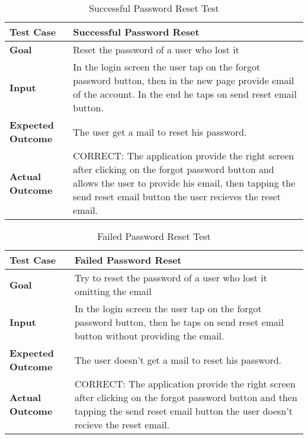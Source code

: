 \begin{table}[H]
	\centering
	\begin{tabular}{|l|l|}
	\hline
	\textbf{Test Case}& Successful Password Reset\\
	\hline
	\textbf{Goal}& Reset the password of a user who lost it\\
	\hline
	\textbf{Input}& 
	\begin{minipage}{.7\linewidth}
	In the login screen the user tap on the forgot password button, then in the new page provide email of the account. In the end he taps on send reset email button.
	\end{minipage}\\
	\hline
	\textbf{Expected Outcome}& The user get a mail to reset his password.\\
	\hline
	\textbf{Actual Outcome}& 
	\begin{minipage}{.7\linewidth}
	CORRECT: The application provide the right screen after clicking on the forgot password button and allows the user to provide his email, then tapping the send reset email button the user recieves the reset email.
	\end{minipage}\\
	\hline	
	\end{tabular}
	\caption{Successful Password Reset Test}
\end{table}

\begin{table}[H]
	\centering
	\begin{tabular}{|l|l|}
	\hline
	\textbf{Test Case}& Failed Password Reset\\
	\hline
	\textbf{Goal}& Try to reset the password of a user who lost it omitting the email\\
	\hline
	\textbf{Input}& 
	\begin{minipage}{.7\linewidth}
	In the login screen the user tap on the forgot password button, then he taps on send reset email button without providing the email.
	\end{minipage}\\
	\hline
	\textbf{Expected Outcome}& The user doesn't get a mail to reset his password.\\
	\hline
	\textbf{Actual Outcome}& 
	\begin{minipage}{.7\linewidth}
	CORRECT: The application provide the right screen after clicking on the forgot password button and then tapping the send reset email button the user doesn't recieve the reset email.
	\end{minipage}\\
	\hline	
	\end{tabular}
	\caption{Failed Password Reset Test}
\end{table}

